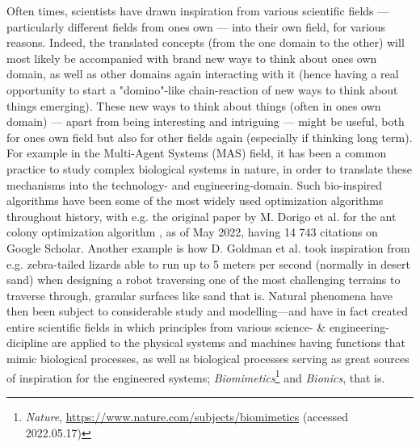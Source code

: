 Often times, scientists have drawn inspiration from various scientific fields — particularly different fields from ones own — into their own field, for various reasons. Indeed, the translated concepts (from the one domain to the other) will most likely be accompanied with brand new ways to think about ones own domain, as well as other domains again interacting with it (hence having a real opportunity to start a "domino"-like chain-reaction of new ways to think about things emerging). These new ways to think about things (often in ones own domain) — apart from being interesting and intriguing — might be useful, both for ones own field but also for other fields again (especially if thinking long term). For example in the Multi-Agent Systems (MAS) field, it has been a common practice to study complex biological systems in nature, in order to translate these mechanisms into the technology- and engineering-domain. Such bio-inspired algorithms have been some of the most widely used optimization algorithms throughout history, with e.g. the original paper by M. Dorigo et al. for the ant colony optimization algorithm \cite{dorigo_ant_2006}, as of May 2022, having 14 743 citations on Google Scholar. Another example is how D. Goldman et al. \cite{sandbots} took inspiration from e.g. zebra-tailed lizards able to run up to 5 meters per second (normally in desert sand) when designing a robot traversing one of the most challenging terrains to traverse through, granular surfaces like sand that is. Natural phenomena have then been subject to considerable study and modelling—and have in fact created entire scientific fields in which principles from various science- \& engineering-dicipline are applied to the physical systems and machines having functions that mimic biological processes, as well as biological processes serving as great sources of inspiration for the engineered systems; \textit{Biomimetics}\footnote{\textit{Nature}, \url{https://www.nature.com/subjects/biomimetics} (accessed 2022.05.17)} and \textit{Bionics}, that is.

